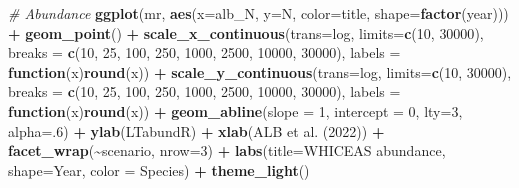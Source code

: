 \documentclass[
]{book}
\newenvironment{Shaded}{\begin{snugshade}}{\end{snugshade}}
\newcommand{\AttributeTok}[1]{\textcolor[rgb]{0.13,0.29,0.53}{#1}}
\newcommand{\CommentTok}[1]{\textcolor[rgb]{0.56,0.35,0.01}{\textit{#1}}}
\newcommand{\ControlFlowTok}[1]{\textcolor[rgb]{0.13,0.29,0.53}{\textbf{#1}}}
\newcommand{\DecValTok}[1]{\textcolor[rgb]{0.00,0.00,0.81}{#1}}
\newcommand{\FunctionTok}[1]{\textcolor[rgb]{0.13,0.29,0.53}{\textbf{#1}}}
\newcommand{\NormalTok}[1]{#1}
\newcommand{\SpecialCharTok}[1]{\textcolor[rgb]{0.81,0.36,0.00}{\textbf{#1}}}
\newcommand{\StringTok}[1]{\textcolor[rgb]{0.31,0.60,0.02}{#1}}
\begin{document}
\begin{Shaded}
\begin{Highlighting}[]
\CommentTok{\# Abundance}
\FunctionTok{ggplot}\NormalTok{(mr,}
       \FunctionTok{aes}\NormalTok{(}\AttributeTok{x=}\NormalTok{alb\_N, }\AttributeTok{y=}\NormalTok{N, }
           \AttributeTok{color=}\NormalTok{title, }\AttributeTok{shape=}\FunctionTok{factor}\NormalTok{(year))) }\SpecialCharTok{+}
    \FunctionTok{geom\_point}\NormalTok{() }\SpecialCharTok{+}
    \FunctionTok{scale\_x\_continuous}\NormalTok{(}\AttributeTok{trans=}\StringTok{\textquotesingle{}log\textquotesingle{}}\NormalTok{, }
                       \AttributeTok{limits=}\FunctionTok{c}\NormalTok{(}\DecValTok{10}\NormalTok{, }\DecValTok{30000}\NormalTok{), }
                       \AttributeTok{breaks =} \FunctionTok{c}\NormalTok{(}\DecValTok{10}\NormalTok{, }\DecValTok{25}\NormalTok{, }\DecValTok{100}\NormalTok{, }\DecValTok{250}\NormalTok{, }\DecValTok{1000}\NormalTok{, }\DecValTok{2500}\NormalTok{, }\DecValTok{10000}\NormalTok{, }\DecValTok{30000}\NormalTok{),}
                       \AttributeTok{labels =} \ControlFlowTok{function}\NormalTok{(x)}\FunctionTok{round}\NormalTok{(x)) }\SpecialCharTok{+}
    \FunctionTok{scale\_y\_continuous}\NormalTok{(}\AttributeTok{trans=}\StringTok{\textquotesingle{}log\textquotesingle{}}\NormalTok{, }
                       \AttributeTok{limits=}\FunctionTok{c}\NormalTok{(}\DecValTok{10}\NormalTok{, }\DecValTok{30000}\NormalTok{), }
                       \AttributeTok{breaks =} \FunctionTok{c}\NormalTok{(}\DecValTok{10}\NormalTok{, }\DecValTok{25}\NormalTok{, }\DecValTok{100}\NormalTok{, }\DecValTok{250}\NormalTok{, }\DecValTok{1000}\NormalTok{, }\DecValTok{2500}\NormalTok{, }\DecValTok{10000}\NormalTok{, }\DecValTok{30000}\NormalTok{),}
                       \AttributeTok{labels =} \ControlFlowTok{function}\NormalTok{(x)}\FunctionTok{round}\NormalTok{(x)) }\SpecialCharTok{+}
    \FunctionTok{geom\_abline}\NormalTok{(}\AttributeTok{slope =} \DecValTok{1}\NormalTok{, }\AttributeTok{intercept =} \DecValTok{0}\NormalTok{, }\AttributeTok{lty=}\DecValTok{3}\NormalTok{, }\AttributeTok{alpha=}\NormalTok{.}\DecValTok{6}\NormalTok{) }\SpecialCharTok{+}
    \FunctionTok{ylab}\NormalTok{(}\StringTok{\textquotesingle{}LTabundR\textquotesingle{}}\NormalTok{) }\SpecialCharTok{+} \FunctionTok{xlab}\NormalTok{(}\StringTok{\textquotesingle{}ALB et al. (2022)\textquotesingle{}}\NormalTok{) }\SpecialCharTok{+}
  \FunctionTok{facet\_wrap}\NormalTok{(}\SpecialCharTok{\textasciitilde{}}\NormalTok{scenario, }\AttributeTok{nrow=}\DecValTok{3}\NormalTok{) }\SpecialCharTok{+} 
  \FunctionTok{labs}\NormalTok{(}\AttributeTok{title=}\StringTok{\textquotesingle{}WHICEAS abundance\textquotesingle{}}\NormalTok{, }
       \AttributeTok{shape=}\StringTok{\textquotesingle{}Year\textquotesingle{}}\NormalTok{, }\AttributeTok{color =} \StringTok{\textquotesingle{}Species\textquotesingle{}}\NormalTok{) }\SpecialCharTok{+} 
  \FunctionTok{theme\_light}\NormalTok{()}
\end{Highlighting}
\end{Shaded}
\end{document}
